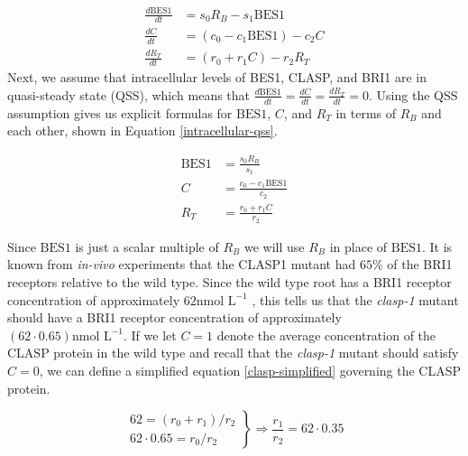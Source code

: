 \documentclass[referee,pdflatex,sn-mathphys-num]{sn-jnl}
\begin{document}
\begin{appendices}
\begin{equation}
\label{intracellular-ode}
\begin{aligned}
  \frac{ d\text{BES1} }{ dt } &= s_{0}R_{B} - s_{1} \text{BES1} \\[5pt]
  \frac{ dC }{ dt } &= (c_{0} - c_{1}\text{BES1}) - c_{2}C \\[5pt]
  \frac{ dR_{T} }{ dt } &= (r_{0}  + r_{1}C) - r_{2}R_{T}
\end{aligned}
\end{equation}
Next, we assume that intracellular levels of BES1, CLASP, and BRI1 are in quasi-steady state (QSS), which means that $\frac{d\text{BES1}}{dt} = \frac{dC}{dt} = \frac{dR_{T}}{dt} = 0$. Using the QSS assumption gives us explicit formulas for $\text{BES1}$, $C$, and $R_{T}$ in terms of $R_{B}$ and each other, shown in Equation \eqref{intracellular-qss}. 

\begin{equation}
\label{intracellular-qss}
\begin{aligned}
  \text{BES1} &= \frac{ s_{0} R_{B}}{ s_{1} } \\[5pt]
  C &= \frac{ c_{0} - c_{1}\text{BES1} }{ c_{2} } \\[5pt]
  R_{T} &=\frac{ r_{0} + r_{1}C }{r_{2} } 
\end{aligned}
\end{equation}

Since $\text{BES1}$ is just a scalar multiple of $R_{B}$ we will use $R_{B}$ in place of $\text{BES1}$. It is known from \emph{in-vivo} experiments \cite{ruan2018} that the CLASP1 mutant had $65\%$ of the BRI1 receptors relative to the wild type. Since the wild type root has a BRI1 receptor concentration of approximately $62\text{nmol L}^{ -1 }$ \cite{vanesse2012}, this tells us that the \emph{clasp-1} mutant should have a BRI1 receptor concentration of approximately $(62 \cdot 0.65)\text{nmol L}^{ -1 }$. If we let $C = 1$ denote the average concentration of the CLASP protein in the wild type and recall that the \emph{clasp-1} mutant should satisfy $C = 0$, we can define a simplified equation \eqref{clasp-simplified} governing the CLASP protein.

\begin{equation}
\label{clasp-simplified}
\left.\begin{aligned}
  62 = (r_{0} + r_{1}) / r_{2} \\
  62 \cdot 0.65 = r_{0} / r_{2}
\end{aligned}\right\rbrace \Rightarrow  \frac{r_{1}}{r_{2}} = 62 \cdot 0.35
\end{equation}


\end{appendices}
\end{document}
